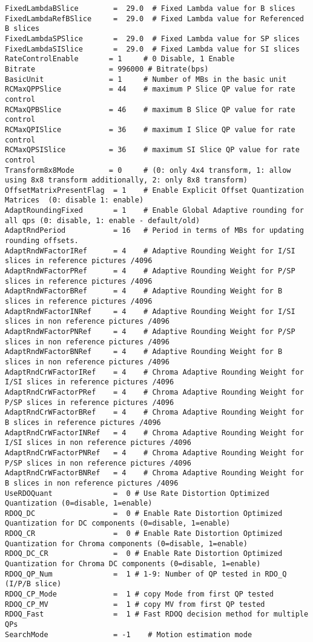 \begin{lstlisting}
FixedLambdaBSlice        =  29.0  # Fixed Lambda value for B slices
FixedLambdaRefBSlice     =  29.0  # Fixed Lambda value for Referenced B slices
FixedLambdaSPSlice       =  29.0  # Fixed Lambda value for SP slices
FixedLambdaSISlice       =  29.0  # Fixed Lambda value for SI slices
RateControlEnable       = 1     # 0 Disable, 1 Enable
Bitrate                 = 996000 # Bitrate(bps)
BasicUnit               = 1     # Number of MBs in the basic unit
RCMaxQPPSlice           = 44    # maximum P Slice QP value for rate control
RCMaxQPBSlice           = 46    # maximum B Slice QP value for rate control
RCMaxQPISlice           = 36    # maximum I Slice QP value for rate control
RCMaxQPSISlice          = 36    # maximum SI Slice QP value for rate control
Transform8x8Mode        = 0     # (0: only 4x4 transform, 1: allow using 8x8 transform additionally, 2: only 8x8 transform)
OffsetMatrixPresentFlag  = 1    # Enable Explicit Offset Quantization Matrices  (0: disable 1: enable)
AdaptRoundingFixed       = 1    # Enable Global Adaptive rounding for all qps (0: disable, 1: enable - default/old)
AdaptRndPeriod           = 16   # Period in terms of MBs for updating rounding offsets. 
AdaptRndWFactorIRef      = 4    # Adaptive Rounding Weight for I/SI slices in reference pictures /4096
AdaptRndWFactorPRef      = 4    # Adaptive Rounding Weight for P/SP slices in reference pictures /4096
AdaptRndWFactorBRef      = 4    # Adaptive Rounding Weight for B slices in reference pictures /4096
AdaptRndWFactorINRef     = 4    # Adaptive Rounding Weight for I/SI slices in non reference pictures /4096
AdaptRndWFactorPNRef     = 4    # Adaptive Rounding Weight for P/SP slices in non reference pictures /4096
AdaptRndWFactorBNRef     = 4    # Adaptive Rounding Weight for B slices in non reference pictures /4096
AdaptRndCrWFactorIRef    = 4    # Chroma Adaptive Rounding Weight for I/SI slices in reference pictures /4096
AdaptRndCrWFactorPRef    = 4    # Chroma Adaptive Rounding Weight for P/SP slices in reference pictures /4096
AdaptRndCrWFactorBRef    = 4    # Chroma Adaptive Rounding Weight for B slices in reference pictures /4096
AdaptRndCrWFactorINRef   = 4    # Chroma Adaptive Rounding Weight for I/SI slices in non reference pictures /4096
AdaptRndCrWFactorPNRef   = 4    # Chroma Adaptive Rounding Weight for P/SP slices in non reference pictures /4096
AdaptRndCrWFactorBNRef   = 4    # Chroma Adaptive Rounding Weight for B slices in non reference pictures /4096
UseRDOQuant              =  0 # Use Rate Distortion Optimized Quantization (0=disable, 1=enable)
RDOQ_DC                  =  0 # Enable Rate Distortion Optimized Quantization for DC components (0=disable, 1=enable)
RDOQ_CR                  =  0 # Enable Rate Distortion Optimized Quantization for Chroma components (0=disable, 1=enable)
RDOQ_DC_CR               =  0 # Enable Rate Distortion Optimized Quantization for Chroma DC components (0=disable, 1=enable)
RDOQ_QP_Num              =  1 # 1-9: Number of QP tested in RDO_Q (I/P/B slice)
RDOQ_CP_Mode             =  1 # copy Mode from first QP tested
RDOQ_CP_MV               =  1 # copy MV from first QP tested
RDOQ_Fast                =  1 # Fast RDOQ decision method for multiple QPs
SearchMode               = -1    # Motion estimation mode

\end{lstlisting}




